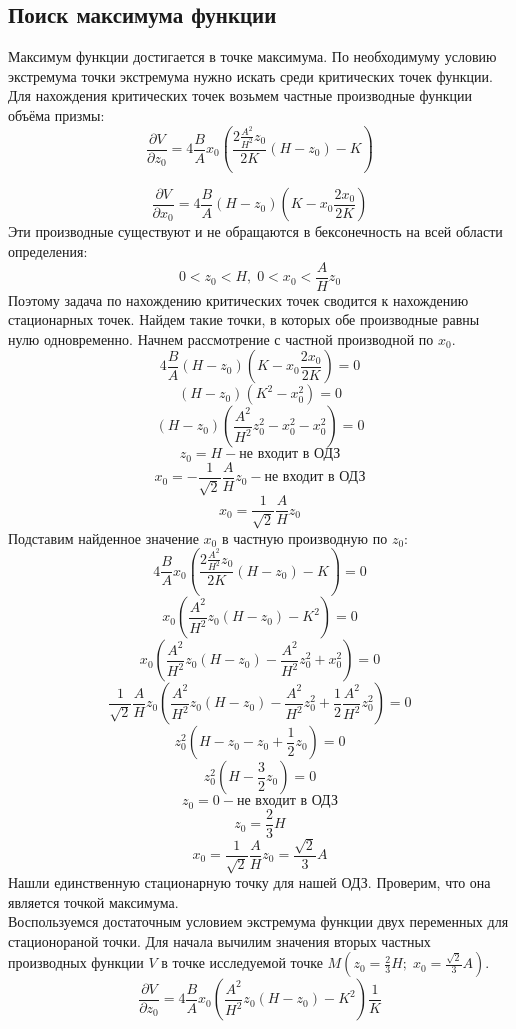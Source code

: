 \documentclass{article}
\begin{document}
\subsection{Поиск максимума функции}
Максимум функции достигается в точке максимума. По необходимуму условию экстремума точки экстремума нужно искать среди критических точек функции. Для нахождения критических точек возьмем частные производные функции объёма призмы:
$$
\frac{\partial V}{\partial z_0} = 4\frac{B}{A} x_0 
\left( 
\frac{2\frac{A^2}{H^2}z_0}{2K} (H-z_0) - K
\right) 
$$

$$
\frac{\partial V}{\partial x_0} = 4\frac{B}{A} (H-z_0) 
\left( 
K - x_0 \frac{2x_0}{2K}
\right) 
$$
Эти производные существуют и не обращаются в бексонечность на всей области определения:
$$
0 < z_0 < H, \; 0 < x_0 < \frac{A}{H}z_0
$$
Поэтому задача по нахождению критических точек сводится к нахождению стационарных точек. Найдем такие точки, в которых обе производные равны нулю одновременно. Начнем рассмотрение с частной производной по $x_0$.
$$
4\frac{B}{A} (H-z_0) 
\left( 
K - x_0 \frac{2x_0}{2K}
\right) = 0
$$
$$
(H-z_0) 
\left( 
K^2 - x_0^2
\right) = 0
$$
$$
(H-z_0) 
\left( 
\frac{A^2}{H^2} z_0^2 - x_0^2 - x_0^2
\right) = 0
$$
$$
z_0 = H - \text{не входит в ОДЗ}
$$
$$
x_0 = - \frac{1}{\sqrt{2}}\frac{A}{H}z_0 - \text{не входит в ОДЗ}
$$
$$
x_0 = \frac{1}{\sqrt{2}}\frac{A}{H}z_0
$$
Подставим найденное значение $x_0$ в частную производную по $z_0$:
$$
4\frac{B}{A} x_0 
\left( 
\frac{2\frac{A^2}{H^2}z_0}{2K} (H-z_0) - K
\right) = 0
$$
$$
x_0 
\left( 
\frac{A^2}{H^2}z_0 (H-z_0) - K^2
\right) = 0
$$
$$
x_0 
\left( 
\frac{A^2}{H^2}z_0 (H-z_0) - \frac{A^2}{H^2} z_0^2 + x_0^2
\right) = 0
$$
$$
\frac{1}{\sqrt{2}}\frac{A}{H}z_0 
\left( 
\frac{A^2}{H^2}z_0 (H-z_0) - \frac{A^2}{H^2} z_0^2 + \frac{1}{2}\frac{A^2}{H^2}z_0^2
\right) = 0
$$
$$
z_0^2
\left( 
H-z_0 - z_0 + \frac{1}{2}z_0
\right) = 0
$$
$$
z_0^2
\left( 
H - \frac{3}{2}z_0
\right) = 0
$$
$$
z_0 = 0 - \text{не входит в ОДЗ}
$$
$$
z_0 = \frac{2}{3}H
$$
$$
x_0 = \frac{1}{\sqrt{2}}\frac{A}{H} z_0 = \frac{\sqrt{2}}{3}A
$$
Нашли единственную стационарную точку для нашей ОДЗ. Проверим, что она является точкой максимума.\\
Воспользуемся достаточным условием экстремума функции двух переменных для стационораной точки. Для начала вычилим значения вторых частных производных функции $V$ в точке исследуемой точке $M(z_0 = \frac{2}{3}H; \; x_0 = \frac{\sqrt{2}}{3}A)$.
$$
\frac{\partial V}{\partial z_0} = 4\frac{B}{A} x_0 
\left( 
\frac{A^2}{H^2}z_0 (H-z_0) - K^2
\right) \frac{1}{K}
$$
\end{document}
